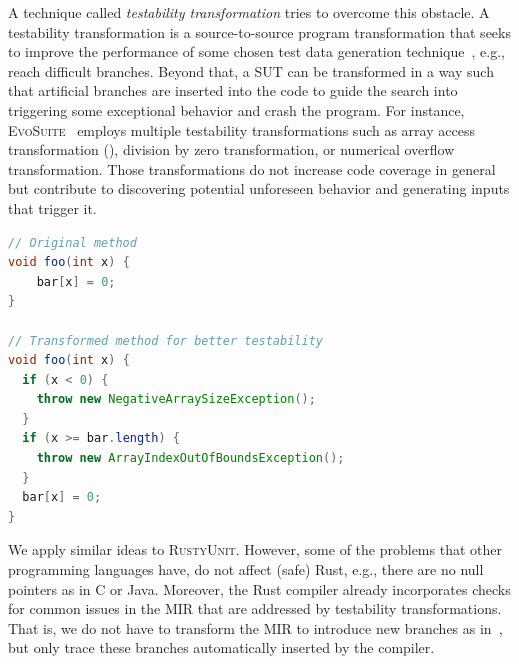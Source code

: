 \documentclass[paper=a4,%
  twoside,%
  BCOR4mm,%
  abstract=true,%
  toc=bibliography,%
  chapterprefix=true,%
  toc=bibliographynumbered,%
  open=right,%
  english,%
  pagesize=pdftex]{scrreprt}
\newcommand{\tech}{\textsc{RustyUnit}\xspace}
\newcommand{\mir}{\ac{MIR}\xspace}
\begin{document}
A technique called \emph{testability transformation} tries to overcome this obstacle. A testability transformation is a source-to-source program transformation that seeks to improve the performance of some chosen test data generation technique~\cite{Harman2004}, e.g., reach difficult branches. Beyond that, a \ac{SUT} can be transformed in a way such that artificial branches are inserted into the code to guide the search into triggering some exceptional behavior and crash the program. For instance, \textsc{EvoSuite}~\cite{Fraser2013} employs multiple testability transformations such as array access transformation (), division by zero transformation, or numerical overflow transformation. Those transformations do not increase code coverage in general but contribute to discovering potential unforeseen behavior and generating inputs that trigger it.

\begin{lstlisting}[language=Java, style=boxed, caption={Array access transformation in \textsc{EvoSuite} for Java}, label=lst:evosuite-array-access-transformation]
// Original method
void foo(int x) {
    bar[x] = 0;
}

// Transformed method for better testability
void foo(int x) {
  if (x < 0) {
    throw new NegativeArraySizeException();
  }
  if (x >= bar.length) {
    throw new ArrayIndexOutOfBoundsException();
  }
  bar[x] = 0;
}
\end{lstlisting}

We apply similar ideas to \tech. However, some of the problems that other programming languages have, do not affect (safe) Rust, e.g., there are no null pointers as in C or Java. Moreover, the Rust compiler already incorporates checks for common issues in the \mir that are addressed by testability transformations. That is, we do not have to transform the \mir to introduce new branches as in~, but only trace these branches automatically inserted by the compiler. 

\end{document}
